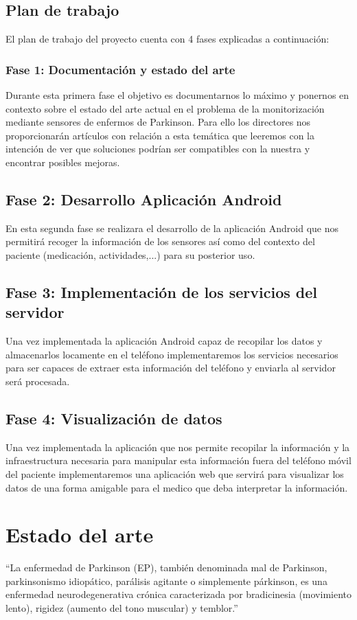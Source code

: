 \documentclass[11pt,spanish]{article}
\begin{document}
\subsection{Plan de trabajo}
El plan de trabajo del proyecto cuenta con 4 fases explicadas a continuación:

\subsubsection{Fase 1: Documentación y estado del arte}
Durante esta primera fase el objetivo es documentarnos lo máximo y ponernos en contexto sobre el estado del arte actual en el problema de la monitorización mediante sensores de enfermos de Parkinson. Para ello los directores nos proporcionarán artículos con relación a esta temática que leeremos con la intención de ver que soluciones podrían ser compatibles con la nuestra y encontrar posibles mejoras.

\subsection{Fase 2: Desarrollo Aplicación Android}
En esta segunda fase se realizara el desarrollo de la aplicación Android que nos permitirá recoger la información de los sensores así como del contexto del paciente (medicación, actividades,...) para su posterior uso.

\subsection{Fase 3: Implementación de los servicios del servidor}
Una vez implementada la aplicación Android capaz de recopilar los datos y almacenarlos locamente en el teléfono implementaremos los servicios necesarios para ser capaces de extraer esta información del teléfono y enviarla al servidor será procesada.

\subsection{Fase 4: Visualización de datos}
Una vez implementada la aplicación que nos permite recopilar la información y la infraestructura necesaria para manipular esta información fuera del teléfono móvil del paciente implementaremos una aplicación web que servirá para visualizar los datos de una forma amigable para el medico que deba interpretar la información.

\newpage

\section{Estado del arte}
“La enfermedad de Parkinson (EP), también denominada mal de Parkinson, parkinsonismo idiopático, parálisis agitante o simplemente párkinson, es una enfermedad neurodegenerativa crónica caracterizada por bradicinesia (movimiento lento), rigidez (aumento del tono muscular) y temblor.” \cite{Wikipedia} 
\newline
\end{document}
